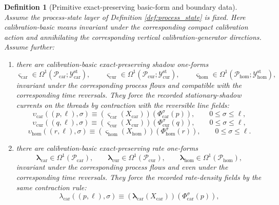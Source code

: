 \documentclass[11pt]{article}
\newcommand{\TensorStatTagClass}{\mathcal Y_{\mathrm{car}}^{\mathrm{st}}}
\newcommand{\CurStatTagClass}{\mathcal Y_{\mathrm{cur}}^{\mathrm{st}}}
\newcommand{\HomStatTagClass}{\mathcal Y_{\mathrm{hom}}^{\mathrm{st}}}
\newcommand{\TensorShadowDensity}{\upsilon_{\mathrm{car}}}
\newcommand{\CurShadowDensity}{\upsilon_{\mathrm{cur}}}
\newcommand{\HomShadowDensity}{\upsilon_{\mathrm{hom}}}
\newcommand{\TensorRateDensity}{\lambda_{\mathrm{car}}}
\newcommand{\TensorProcSpace}{\mathcal P_{\mathrm{car}}}
\newcommand{\CurProcSpace}{\mathcal P_{\mathrm{cur}}}
\newcommand{\HomProcSpace}{\mathcal P_{\mathrm{hom}}}
\newcommand{\TensorFlowField}{X_{\mathrm{car}}}
\newcommand{\CurFlowField}{X_{\mathrm{cur}}}
\newcommand{\HomFlowField}{X_{\mathrm{hom}}}
\newcommand{\TensorOrbitFlow}{\Phi_{\mathrm{car}}}
\newcommand{\CurOrbitFlow}{\Phi_{\mathrm{cur}}}
\newcommand{\HomOrbitFlow}{\Phi_{\mathrm{hom}}}
\newcommand{\TensorShadowForm}{\boldsymbol{\varsigma}_{\mathrm{car}}}
\newcommand{\CurShadowForm}{\boldsymbol{\varsigma}_{\mathrm{cur}}}
\newcommand{\HomShadowForm}{\boldsymbol{\varsigma}_{\mathrm{hom}}}
\newcommand{\TensorRateForm}{\boldsymbol{\lambda}_{\mathrm{car}}}
\newcommand{\CurRateForm}{\boldsymbol{\lambda}_{\mathrm{cur}}}
\newcommand{\HomRateForm}{\boldsymbol{\lambda}_{\mathrm{hom}}}
\newtheorem{definition}{Definition}
\begin{document}
\begin{definition}[Primitive exact-preserving basic-form and boundary data]
\label{def:basic_forms}
Assume the process-state layer of Definition \ref{def:process_state} is fixed. Here \emph{calibration-basic} means invariant under the corresponding compact calibration action and annihilating the corresponding vertical calibration-generator directions. Assume further:
\begin{enumerate}
    \item there are calibration-basic exact-preserving shadow one-forms
    \[
    \TensorShadowForm\in\Omega^1(\TensorProcSpace;\TensorStatTagClass),\qquad
    \CurShadowForm\in\Omega^1(\CurProcSpace;\CurStatTagClass),\qquad
    \HomShadowForm\in\Omega^1(\HomProcSpace;\HomStatTagClass),
    \]
    invariant under the corresponding process flows and compatible with the corresponding time reversals. They force the recorded stationary-shadow currents on the threads by contraction with the reversible line fields:
    \begin{equation}
    \TensorShadowDensity((p,\ell),\sigma)
    \equiv
    \left(\TensorShadowForm(\TensorFlowField)\right)(\TensorOrbitFlow^\sigma(p)),
    \qquad
    0\le\sigma\le\ell,
    \label{eq:shadow_density_from_form_car}
    \end{equation}
    \begin{equation}
    \CurShadowDensity((q,\ell),\sigma)
    \equiv
    \left(\CurShadowForm(\CurFlowField)\right)(\CurOrbitFlow^\sigma(q)),
    \qquad
    0\le\sigma\le\ell,
    \label{eq:shadow_density_from_form_cur}
    \end{equation}
    \begin{equation}
    \HomShadowDensity((r,\ell),\sigma)
    \equiv
    \left(\HomShadowForm(\HomFlowField)\right)(\HomOrbitFlow^\sigma(r)),
    \qquad
    0\le\sigma\le\ell.
    \label{eq:shadow_density_from_form_hom}
    \end{equation}
    \item there are calibration-basic exact-preserving rate one-forms
    \[
    \TensorRateForm\in\Omega^1(\TensorProcSpace),\qquad
    \CurRateForm\in\Omega^1(\CurProcSpace),\qquad
    \HomRateForm\in\Omega^1(\HomProcSpace),
    \]
    invariant under the corresponding process flows and even under the corresponding time reversals. They force the recorded rate-density fields by the same contraction rule:
    \begin{equation}
    \TensorRateDensity((p,\ell),\sigma)
    \equiv
    \left(\TensorRateForm(\TensorFlowField)\right)(\TensorOrbitFlow^\sigma(p)),

\end{equation}
\end{enumerate}
\end{definition}
\end{document}
